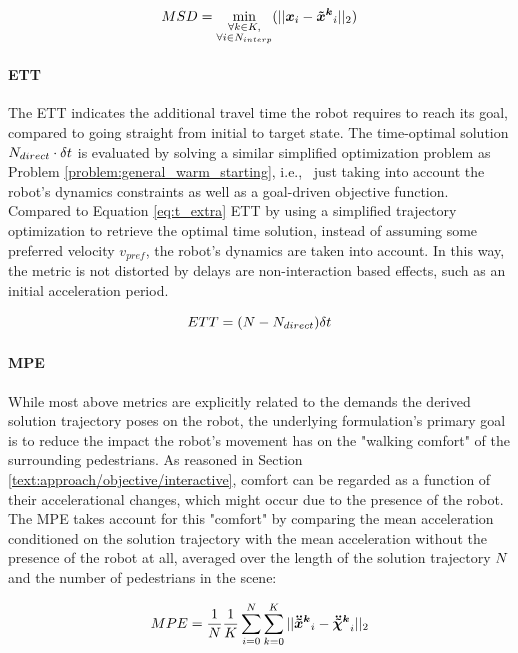 \begin{equation}
MSD = \min_{\substack{\forall k \in K, \\ \forall i \in \stepssolution_{interp}}}(||\x_i - \xped[k]_i||_2) 
\end{equation}

\paragraph{\ac{ETT}}
The \ac{ETT} indicates the additional travel time the robot requires to reach its goal, compared to going straight from initial to target state. The time-optimal solution $N_{direct} \cdot \delta t$ is evaluated by solving a similar simplified optimization problem as Problem \ref{problem:general_warm_starting}, i.e., \ just taking into account the robot's dynamics constraints as well as a goal-driven objective function. Compared to Equation \ref{eq:t_extra} \ac{ETT} by using a simplified trajectory optimization to retrieve the optimal time solution, instead of assuming some preferred velocity $v_{pref}$, the robot's dynamics are taken into account. In this way, the metric is not distorted by delays are non-interaction based effects, such as an initial acceleration period.  

\begin{equation}
ETT = (N - N_{direct})\delta t
\end{equation}

\paragraph{\ac{MPE}}
While most above metrics are explicitly related to the demands the derived solution trajectory poses on the robot, the underlying formulation's primary goal is to reduce the impact the robot's movement has on the "walking comfort" of the surrounding pedestrians. As reasoned in Section \ref{text:approach/objective/interactive}, comfort can be regarded as a function of their accelerational changes, which might occur due to the presence of the robot. The MPE takes account for this "comfort" by comparing the mean acceleration conditioned on the solution trajectory with the mean acceleration without the presence of the robot at all, averaged over the length of the solution trajectory $N$ and the number of pedestrians in the scene:

\begin{equation}
MPE = \frac{1}{\stepssolution} \frac{1}{K} \sum_{i=0}^{\stepssolution} \sum_{k=0}^K ||\ddxped[k]_i - \ddxpedwo[k]_i||_2
\end{equation}

